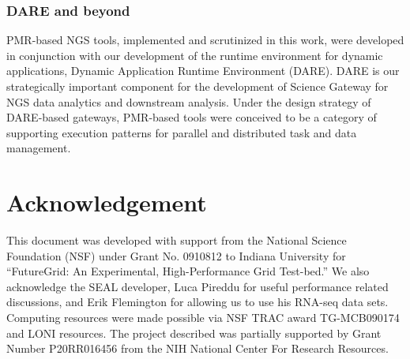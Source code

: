 \documentclass{sig-alternate}
\begin{document}
\subsubsection{DARE and beyond}
PMR-based NGS tools, implemented and scrutinized in this work, were developed in conjunction with our development of the runtime environment for dynamic applications, Dynamic Application Runtime Environment (DARE).  DARE is our strategically important component for the development of Science Gateway for NGS data analytics and downstream analysis.  Under the design strategy of DARE-based gateways, PMR-based tools were conceived to be a category of supporting execution patterns for parallel and distributed task and data management.  




\section*{Acknowledgement}
This document was developed with support from the National Science
Foundation (NSF) under Grant No.  0910812 to Indiana University for
``FutureGrid: An Experimental, High-Performance Grid Test-bed.''  We
also acknowledge the SEAL developer, Luca Pireddu for useful performance related
discussions, and Erik Flemington for allowing us to use his RNA-seq data sets. Computing resources were made possible via NSF TRAC award TG-MCB090174 and LONI resources.  The project described was partially
supported by Grant Number P20RR016456 from the NIH National Center For
Research Resources.

 

\end{document}

